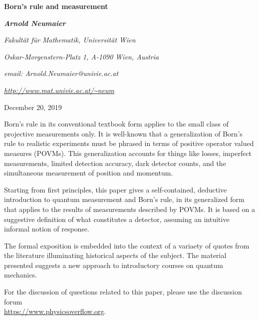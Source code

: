 \documentclass[12pt]{article}
\begin{document}
\begin{center}
{\LARGE \bf Born's rule and measurement} \\

\vspace{1cm}

\centerline{\sl {\large \bf Arnold Neumaier}}

\vspace{0.5cm}

\centerline{\sl Fakult\"at f\"ur Mathematik, Universit\"at Wien}
\centerline{\sl Oskar-Morgenstern-Platz 1, A-1090 Wien, Austria}
\centerline{\sl email: Arnold.Neumaier@univie.ac.at}
\centerline{\sl \url{http://www.mat.univie.ac.at/~neum}}

\end{center}


\hfill December 20, 2019

\vspace{0.5cm}



\bigskip
{}
Born's rule in its conventional textbook form applies to the small
class of projective measurements only. It is well-known that a
generalization of Born's rule to realistic experiments must be phrased
in terms of positive operator valued measures (POVMs). This
generalization accounts for things like losses, imperfect measurements,
limited detection accuracy, dark detector counts, and the simultaneous
measurement of position and momentum.

Starting from first principles, this paper gives a self-contained,
deductive introduction to quantum measurement and Born's rule, in its 
generalized form that applies to the results of measurements described 
by POVMs. It is based on a suggestive definition of what constitutes a 
detector, assuming an intuitive informal notion of response. 

The formal exposition is embedded into the context of a variaety of 
quotes from the literature illuminating historical aspects of the 
subject. The material presented suggests a new approach to introductory 
courses on quantum mechanics.


\vfill
For the discussion of questions related to this paper, please use
the discussion forum \\
\url{https://www.physicsoverflow.org}.
\end{document}
